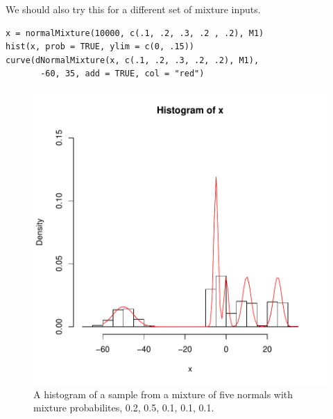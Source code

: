 We should also try this for a different set of mixture inputs.
\begin{verbatim}
x = normalMixture(10000, c(.1, .2, .3, .2 , .2), M1)
hist(x, prob = TRUE, ylim = c(0, .15))
curve(dNormalMixture(x, c(.1, .2, .3, .2, .2), M1), 
       -60, 35, add = TRUE, col = "red")
\end{verbatim}


\begin{figure}[htbp]
\begin{center}
\leavevmode
\includegraphics{RNG/images/mixtureSample1.pdf}
\caption{A histogram of a sample from a mixture of five normals with mixture
  probabilites, 0.2, 0.5, 0.1, 0.1, 0.1.}
\label{fig:mix5NormDensity}
\end{center}
\end{figure}

